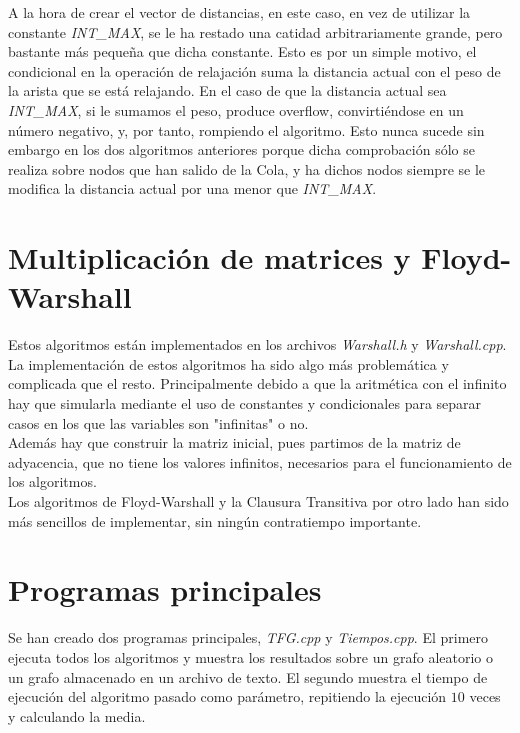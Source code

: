 A la hora de crear el vector de distancias, en este caso, en vez de utilizar la constante \textit{INT\_MAX}, se le ha restado una catidad arbitrariamente grande, pero bastante más pequeña que dicha constante. Esto es por un simple motivo, el condicional en la operación de relajación suma la distancia actual con el peso de la arista que se está relajando. En el caso de que la distancia actual sea \textit{INT\_MAX}, si le sumamos el peso, produce overflow, convirtiéndose en un número negativo, y, por tanto, rompiendo el algoritmo. Esto nunca sucede sin embargo en los dos algoritmos anteriores porque dicha comprobación sólo se realiza sobre nodos que han salido de la Cola, y ha dichos nodos siempre se le modifica la distancia actual por una menor que \textit{INT\_MAX}.

\section{Multiplicación de matrices y Floyd-Warshall}

Estos algoritmos están implementados en los archivos \textit{Warshall.h} y \textit{Warshall.cpp}. La implementación de estos algoritmos ha sido algo más problemática y complicada que el resto. Principalmente debido a que la aritmética con el infinito hay que simularla mediante el uso de constantes y condicionales para separar casos en los que las variables son "infinitas" o no. \\

Además hay que construir la matriz inicial, pues partimos de la matriz de adyacencia, que no tiene los valores infinitos, necesarios para el funcionamiento de los algoritmos. \\

Los algoritmos de Floyd-Warshall y la Clausura Transitiva por otro lado han sido más sencillos de implementar, sin ningún contratiempo importante.

\section{Programas principales}

Se han creado dos programas principales, \textit{TFG.cpp} y \textit{Tiempos.cpp}. El primero ejecuta todos los algoritmos y muestra los resultados sobre un grafo aleatorio o un grafo almacenado en un archivo de texto. El segundo muestra el tiempo de ejecución del algoritmo pasado como parámetro, repitiendo la ejecución $10$ veces y calculando la media. \\

